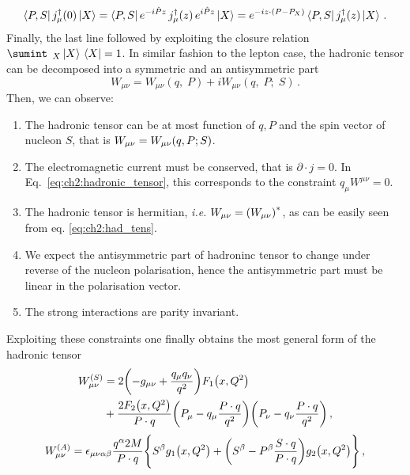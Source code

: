 \begin{equation}
    \bra{P,S} j^{\dag}_{\mu}(0) \ket{X} =  \bra{P,S} e^{-i\hat{P}z} \, j^{\dag}_{\mu}(z) \, e^{i\hat{P}z} \ket{X} =  e^{-i z \cdot \qty(P - P_X )}\bra{P,S} j^{\dag}_{\mu}(z) \ket{X}\,.
\end{equation}
Finally, the last line followed by exploiting the closure relation $\sumint_{\;\; X} \ket*{X} \bra*{X} = 1 $. In similar fashion to the lepton case, the hadronic tensor can be decomposed into a symmetric and an antisymmetric part
\begin{equation}
    W_{\mu \nu} =  W_{\mu \nu} (q, \;P ) + i W_{\mu \nu} (q, \;P ; \; S ) \,.
\end{equation}
Then, we can observe:
\begin{enumerate}
    \item The hadronic tensor can be at most function of $q, P$ and the spin vector of nucleon $S$, that is $W_{\mu \nu} = W_{\mu \nu}\qty(q,P;S)$.  
    \item The electromagnetic current must be conserved, that is $\partial \cdot j = 0$. In Eq.~\eqref{eq:ch2:hadronic_tensor}, this corresponds to the constraint $q_{\mu} W^{\mu \nu} = 0$.
    \item The hadronic tensor is hermitian, \textit{i.e.} $W_{\mu \nu} = \qty(W_{\mu \nu})^{*}$, as can be easily seen from eq. \eqref{eq:ch2:had_tens}. 
    \item We expect the antisymmetric part of hadroninc tensor to change under reverse of the nucleon polarisation, hence the antisymmetric part must be linear in the polarisation vector.
    \item The strong interactions are parity invariant.
\end{enumerate}
Exploiting these constraints one finally obtains the most general form of the hadronic tensor \cite{collins_2011}
\begin{equation}
  \begin{split}
  W_{\mu \nu}^{(S)} & = 2\qty(-g_{\mu \nu} + \frac{q_{\mu} q_{\nu}}{q^2}) F_1 \qty(x, Q^2) \\
  & + \frac{2 F_2 \qty(x , Q^2) }{P \cdot q} \qty(P_{\mu} - q_{\mu} \frac{P \cdot q}{q^2}) \qty(P_{\nu} - q_{\nu} \frac{P \cdot q}{q^2})\,,
  \label{eq:ch2:had_tens_final_symm}
  \end{split}
\end{equation}
\begin{equation}
  \begin{split}
    W_{\mu \nu}^{(A)}  =  \epsilon_{\mu \nu \alpha \beta} \frac{q^{\alpha}2 M}{P \cdot q} \Biggl\{S^{\beta} g_1 \qty(x, Q^2) + \qty(S^{\beta} - P^{\beta} \frac{S \cdot q}{P \cdot q}) g_2 \qty(x,Q^2) \Biggr\} \,,
    \label{eq:ch2:had_tens_final_anti}
  \end{split}
\end{equation}
